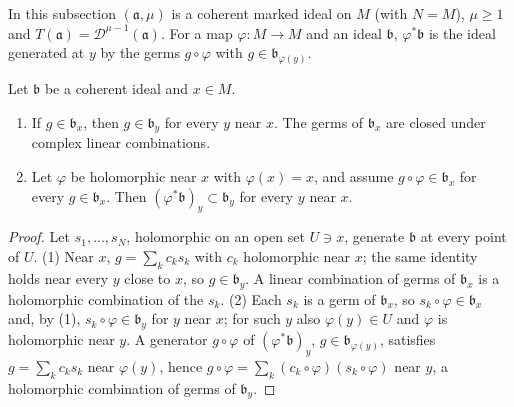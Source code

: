 In this subsection \((\mathfrak a,\mu)\) is a coherent marked ideal on \(M\) (with \(N=M\)), \(\mu\ge1\) and \(T(\mathfrak a)=\mathcal D^{\mu-1}(\mathfrak a)\). For a
map \(\varphi\colon M\to M\) and an ideal \(\mathfrak b\), \(\varphi^*\mathfrak b\) is the ideal generated at \(y\) by the germs \(g\circ\varphi\) with
\(g\in\mathfrak b_{\varphi(y)}\).

\begin{lemma}
\label{mc:coherent-germs}
\leanok
Let \(\mathfrak b\) be a coherent ideal and \(x\in M\).
\begin{enumerate}
\item If \(g\in\mathfrak b_x\), then \(g\in\mathfrak b_y\) for every \(y\) near \(x\). The germs of \(\mathfrak b_x\) are closed under complex linear combinations.
\item Let \(\varphi\) be holomorphic near \(x\) with \(\varphi(x)=x\), and assume \(g\circ\varphi\in\mathfrak b_x\) for every \(g\in\mathfrak b_x\). Then
\((\varphi^*\mathfrak b)_y\subset\mathfrak b_y\) for every \(y\) near \(x\).
\end{enumerate}
\end{lemma}
\begin{proof}
\leanok
Let \(s_1,\dots,s_N\), holomorphic on an open set \(U\ni x\), generate \(\mathfrak b\) at every point of \(U\).
(1) Near \(x\), \(g=\sum_kc_ks_k\) with \(c_k\) holomorphic near \(x\); the same identity holds near every \(y\) close to \(x\), so \(g\in\mathfrak b_y\).
A linear combination of germs of \(\mathfrak b_x\) is a holomorphic combination of the \(s_k\).
(2) Each \(s_k\) is a germ of \(\mathfrak b_x\), so \(s_k\circ\varphi\in\mathfrak b_x\) and, by (1), \(s_k\circ\varphi\in\mathfrak b_y\) for \(y\) near \(x\); for such
\(y\) also \(\varphi(y)\in U\) and \(\varphi\) is holomorphic near \(y\). A generator \(g\circ\varphi\) of \((\varphi^*\mathfrak b)_y\), \(g\in\mathfrak b_{\varphi(y)}\),
satisfies \(g=\sum_kc_ks_k\) near \(\varphi(y)\), hence \(g\circ\varphi=\sum_k(c_k\circ\varphi)(s_k\circ\varphi)\) near \(y\), a holomorphic combination of
germs of \(\mathfrak b_y\).
\end{proof}


